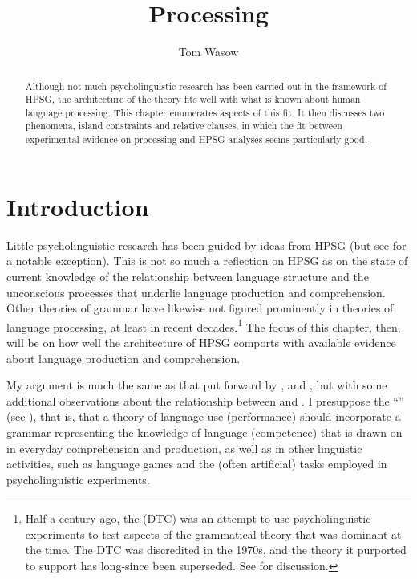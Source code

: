 \documentclass[a4paper]{article}
\title{Processing}
\author{Tom Wasow}
\begin{document}
\label{chap-processing}
\maketitle

\begin{abstract}
Although not much psycholinguistic research has been carried out in the framework of HPSG, the architecture of the theory fits well with what is known about human language processing.  This chapter enumerates aspects of this fit.  It then discusses two phenomena, island constraints and relative clauses, in which the fit between experimental evidence on processing and HPSG analyses seems particularly good.   
\end{abstract}

\section{Introduction}

Little psycholinguistic research has been guided by ideas from HPSG (but see  \citet{Konieczny96a-u} for a notable exception).  This is not so much a reflection on HPSG as on the state of current knowledge of the relationship between language structure and the unconscious processes that underlie language production and comprehension.  Other theories of grammar have likewise not figured prominently in theories of language processing, at least in recent decades.\footnote{Half a century ago, the  (DTC) was an attempt to use psycholinguistic experiments to test aspects of the grammatical theory that was dominant at the time.  The DTC was discredited in the 1970s, and the theory it purported to support has long-since been superseded.  See \citet{FBG74a-u} for discussion.}  The focus of this chapter, then, will be on how well the architecture of HPSG comports with available evidence about language production and comprehension.  

My argument is much the same as that put forward by \citet[Chapter~9]{SWB2003a}, and \citet{SW2011a,SW2015a}, but with some additional observations about the relationship between  and . I presuppose the ``'' (see \citealt[Chapter~1]{Chomsky65a}), that is, that a theory of language use (performance) should incorporate a grammar representing the knowledge of language (competence) that is drawn on in everyday comprehension and production, as well as in other linguistic activities, such as language games and the (often artificial) tasks employed in psycholinguistic experiments.  
\end{document}

